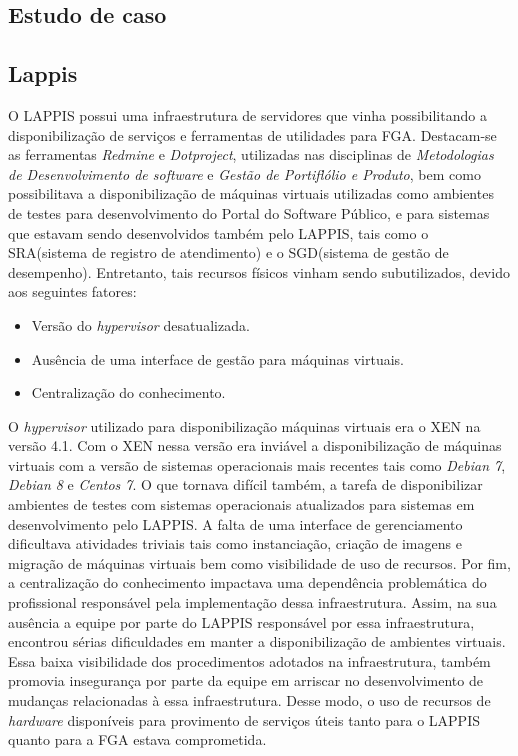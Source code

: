 \begin{apendicesenv}

\partapendices
\chapter{Estudo de caso}
\label{cap:estudo_caso}
\section{Lappis}
O LAPPIS possui uma infraestrutura de servidores que vinha possibilitando a disponibilização de serviços e ferramentas de utilidades para FGA. Destacam-se as ferramentas \textit{Redmine} e \textit{Dotproject}, utilizadas nas disciplinas de \textit{Metodologias de Desenvolvimento de software} e \textit{Gestão de Portiflólio e Produto}, bem como possibilitava a disponibilização de máquinas virtuais utilizadas como ambientes de testes para desenvolvimento do Portal do Software Público, e para sistemas que estavam sendo desenvolvidos também pelo  LAPPIS, tais como o SRA(sistema de registro de atendimento) e o SGD(sistema de gestão de desempenho). Entretanto, tais recursos físicos vinham sendo subutilizados, devido aos seguintes fatores:
\begin{itemize}
 \item Versão do \textit{hypervisor} desatualizada.
 \item Ausência de uma interface de gestão para máquinas virtuais.
 \item Centralização do conhecimento.
\end{itemize}
      
      O \textit{hypervisor} utilizado para disponibilização máquinas virtuais era o XEN na versão 4.1. Com o XEN nessa versão era inviável a disponibilização de máquinas virtuais com a versão de sistemas operacionais mais recentes tais como \textit{Debian 7}, \textit{Debian 8} e \textit{Centos 7}. O que tornava difícil também, a tarefa de disponibilizar ambientes de testes com sistemas operacionais atualizados para sistemas em desenvolvimento pelo LAPPIS. A falta de uma interface de gerenciamento dificultava atividades triviais tais como instanciação, criação de imagens e migração de máquinas virtuais bem como visibilidade de uso de recursos. Por fim, a centralização do conhecimento impactava uma dependência problemática do profissional responsável pela implementação dessa infraestrutura. Assim, na sua ausência a equipe por parte do LAPPIS responsável por essa infraestrutura, encontrou sérias dificuldades em manter a disponibilização de ambientes virtuais. Essa baixa visibilidade dos procedimentos adotados na infraestrutura, também promovia insegurança por parte da equipe em arriscar no desenvolvimento de mudanças relacionadas à essa infraestrutura. Desse modo, o uso de recursos de \textit{hardware} disponíveis para provimento de serviços úteis tanto para o LAPPIS quanto para a FGA estava comprometida. 
      

\end{apendicesenv}
